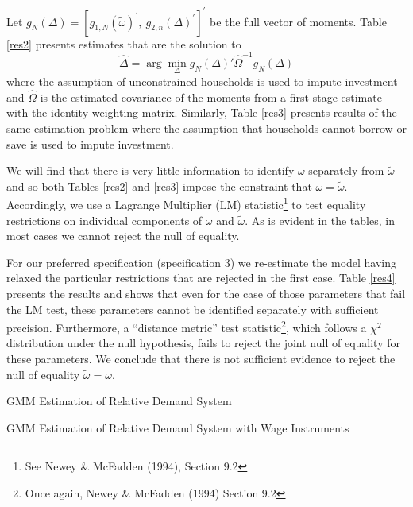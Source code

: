 \documentclass{article}
\begin{document}
Let $g_{N}(\Delta) = [g_{1,N}(\tilde{\omega})^\prime,\ g_{2,n}(\Delta)^\prime]^\prime$ be the full vector of moments. Table \ref{res2} presents estimates that are the solution to
\[ \hat{\Delta} = \arg\min_{\Delta}g_{N}(\Delta)'\hat{\Omega}^{-1}g_{N}(\Delta) \]
where the assumption of unconstrained households is used to impute investment and $\hat{\Omega}$ is the estimated covariance of the moments from a first stage estimate with the identity weighting matrix. Similarly, Table \ref{res3} presents results of the same estimation problem where the assumption that households cannot borrow or save is used to impute investment.

We will find that there is very little information to identify $\omega$ separately from $\tilde{\omega}$ and so both Tables \ref{res2} and \ref{res3} impose the constraint that $\omega=\tilde{\omega}$. Accordingly, we use a Lagrange Multiplier (LM) statistic\footnote{See Newey \& McFadden (1994), Section 9.2} to test equality restrictions on individual components of $\omega$ and $\tilde{\omega}$. As is evident in the tables, in most cases we cannot reject the null of equality. 

For our preferred specification (specification 3) we re-estimate the model having relaxed the particular restrictions that are rejected in the first case. Table \ref{res4} presents the results and shows that even for the case of those parameters that fail the LM test, these parameters cannot be identified separately with sufficient precision. Furthermore, a ``distance metric'' test statistic\footnote{Once again, Newey \& McFadden (1994) Section 9.2}, which follows a $\chi^2$ distribution under the null hypothesis, fails to reject the joint null of equality for these parameters. We conclude that there is not sufficient evidence to reject the null of equality $\tilde{\omega}=\omega$.


\begin{table}\footnotesize\caption{\label{res1}GMM Estimation of Relative Demand System}
    \begin{center}
        
        \captionsetup{width=0.7\textwidth}
    \end{center}
\end{table}

\begin{table}\footnotesize\caption{\label{res1a}GMM Estimation of Relative Demand System with Wage Instruments}
    \begin{center}
        
        \captionsetup{width=0.7\textwidth}
    \end{center}
\end{table}
\end{document}
